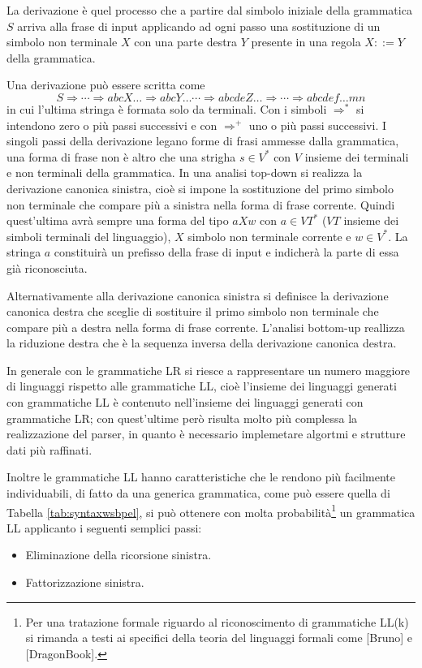 La derivazione è quel processo che a partire dal simbolo iniziale della
grammatica $S$ arriva alla frase di input applicando ad ogni passo una
sostituzione di un simbolo non terminale $X$ con una parte destra $Y$ presente in
una regola $X ::= Y$ della grammatica. 

Una derivazione può essere scritta come $$ S \Rightarrow \cdots \Rightarrow
abcX\ldots \Rightarrow abcY\ldots \cdots \Rightarrow abcdeZ\ldots \Rightarrow
\cdots \Rightarrow abcdef\ldots mn $$ in cui l'ultima stringa è formata solo da
terminali. Con i simboli $ \Rightarrow^*$ si intendono zero o più passi
successivi e con $\Rightarrow^+$ uno o più passi successivi. I singoli passi
della derivazione legano forme di frasi ammesse dalla grammatica, una forma di
frase non è altro che una strigha $s \in V^*$  con $V$ insieme dei terminali e
non terminali della grammatica. In una analisi top-down si realizza la
derivazione canonica sinistra, cioè si impone la sostituzione del primo simbolo
non terminale che compare più a sinistra nella forma di frase corrente. Quindi
quest'ultima avrà sempre una forma del tipo $aXw$ con $a \in VT^*$ ($VT$ insieme
dei simboli terminali del linguaggio), $X$ simbolo non terminale corrente e $w
\in V^*$. La stringa $a$ constituirà un prefisso della frase di input e
indicherà la parte di essa già riconosciuta. 

Alternativamente alla derivazione canonica sinistra si definisce la derivazione
canonica destra che sceglie di sostituire il primo simbolo non terminale che
compare più a destra nella forma di frase corrente. L'analisi bottom-up reallizza
la riduzione destra che è la sequenza inversa della derivazione canonica destra.

In generale con le grammatiche LR si riesce a rappresentare un numero
maggiore di linguaggi rispetto alle grammatiche LL, cioè l'insieme dei
linguaggi generati con grammatiche LL è contenuto nell'insieme dei linguaggi
generati con grammatiche LR; con quest'ultime però risulta molto più complessa
la realizzazione del parser, in quanto è necessario implemetare algortmi e
strutture dati più raffinati.

Inoltre le grammatiche LL hanno caratteristiche che le rendono più facilmente
individuabili, di fatto da una generica grammatica, come può essere quella di
Tabella \ref{tab:syntaxwsbpel}, si può ottenere con molta
probabilità\footnote{Per una tratazione formale riguardo al riconoscimento di
grammatiche LL(k) si rimanda a testi ai specifici della teoria del linguaggi
formali come [Bruno] e [DragonBook].} un grammatica LL applicanto i seguenti
semplici passi:
\begin{itemize}
  \item Eliminazione della ricorsione sinistra.
  \item Fattorizzazione sinistra.
\end{itemize}

